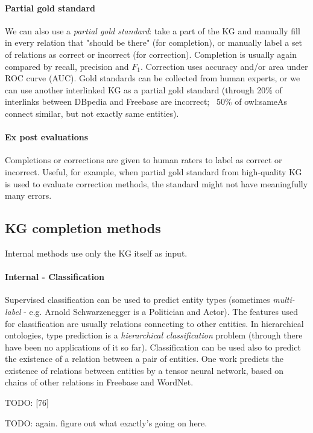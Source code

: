 \paragraph{Partial gold standard}
We can also use a \textit{partial gold standard}: take a part of the KG and
manually fill in every relation that "should be there" (for completion), or
manually label a set of relations as correct or incorrect (for correction).
Completion is usually again compared by recall, precision and $F_1$.
Correction uses accuracy and/or area under ROC curve (AUC).
Gold standards can be collected from human experts, or we can use another
interlinked KG as a partial gold standard (through 20\% of interlinks between
DBpedia and Freebase are incorrect; ~50\% of owl:sameAs connect similar, but not
exactly same entities).

\paragraph{Ex post evaluations}
Completions or corrections are given to human raters to label as correct or
incorrect. Useful, for example, when partial gold standard from high-quality KG
is used to evaluate correction methods, the standard might not have
meaningfully many errors.

\subsection{KG completion methods}
Internal methods use only the KG itself as input.

\paragraph{Internal - Classification}
Supervised classification can be used to predict entity types (sometimes
\textit{multi-label} - e.g. Arnold Schwarzenegger is a Politician and Actor).
The features used for classification are usually relations connecting to other
entities. In hierarchical ontologies, type prediction is a \textit{hierarchical
classification} problem (through there have been no applications of it so far).
Classification can be used also to predict the existence of a relation between
a pair of entities.
One work predicts the existence of relations between entities by a tensor
neural network, based on chains of other
relations in Freebase and WordNet.\cite{neural-tensor-networks-for-kbc}

TODO: [76]

TODO: again. figure out what exactly's going on here.

